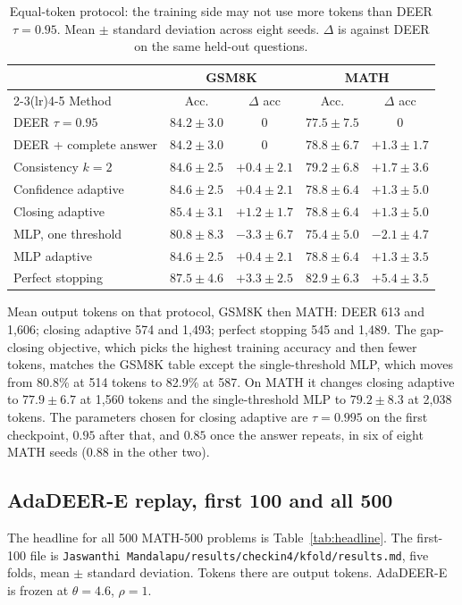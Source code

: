 \begin{table}[!t]
\caption{Equal-token protocol: the training side may not use more tokens than DEER $\tau=0.95$. Mean $\pm$ standard deviation across eight seeds. $\Delta$ is against DEER on the same held-out questions.}
\label{tab:adapt}
\centering
\scriptsize
\begin{tabular}{@{}lcccc@{}}
\toprule
 & \multicolumn{2}{c}{GSM8K} & \multicolumn{2}{c}{MATH} \\
\cmidrule(lr){2-3}\cmidrule(lr){4-5}
Method & Acc. & $\Delta$ acc & Acc. & $\Delta$ acc \\
\midrule
DEER $\tau=0.95$ & $84.2\pm 3.0$ & 0 & $77.5\pm 7.5$ & 0 \\
DEER + complete answer & $84.2\pm 3.0$ & 0 & $78.8\pm 6.7$ & $+1.3\pm 1.7$ \\
Consistency $k=2$ & $84.6\pm 2.5$ & $+0.4\pm 2.1$ & $79.2\pm 6.8$ & $+1.7\pm 3.6$ \\
Confidence adaptive & $84.6\pm 2.5$ & $+0.4\pm 2.1$ & $78.8\pm 6.4$ & $+1.3\pm 5.0$ \\
Closing adaptive & $85.4\pm 3.1$ & $+1.2\pm 1.7$ & $78.8\pm 6.4$ & $+1.3\pm 5.0$ \\
MLP, one threshold & $80.8\pm 8.3$ & $-3.3\pm 6.7$ & $75.4\pm 5.0$ & $-2.1\pm 4.7$ \\
MLP adaptive & $84.6\pm 2.5$ & $+0.4\pm 2.1$ & $78.8\pm 6.4$ & $+1.3\pm 3.5$ \\
Perfect stopping & $87.5\pm 4.6$ & $+3.3\pm 2.5$ & $82.9\pm 6.3$ & $+5.4\pm 3.5$ \\
\bottomrule
\end{tabular}
\end{table}

Mean output tokens on that protocol, GSM8K then MATH: DEER 613 and 1{,}606; closing adaptive 574 and 1{,}493; perfect stopping 545 and 1{,}489.
The gap-closing objective, which picks the highest training accuracy and then fewer tokens, matches the GSM8K table except the single-threshold MLP, which moves from 80.8\% at 514 tokens to 82.9\% at 587.
On MATH it changes closing adaptive to $77.9\pm 6.7$ at 1{,}560 tokens and the single-threshold MLP to $79.2\pm 8.3$ at 2{,}038 tokens.
The parameters chosen for closing adaptive are $\tau=0.995$ on the first checkpoint, $0.95$ after that, and $0.85$ once the answer repeats, in six of eight MATH seeds ($0.88$ in the other two).

\subsection{AdaDEER-E replay, first 100 and all 500}
The headline for all 500 MATH-500 problems is Table~\ref{tab:headline}.
The first-100 file is \texttt{Jaswanthi Mandalapu/results/checkin4/kfold/results.md}, five folds, mean $\pm$ standard deviation.
Tokens there are output tokens.
AdaDEER-E is frozen at $\theta=4.6$, $\rho=1$.

